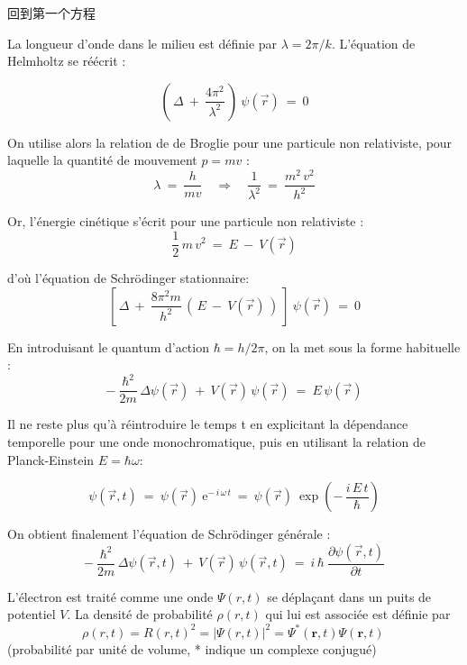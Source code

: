 \documentclass{article}
\begin{document}
回到第一个方程\par
La longueur d'onde dans le milieu est d\'efinie par $\lambda = 2 \pi/k$. L'\'equation de Helmholtz se r\'e\'ecrit :

$$
\left( \, \Delta \ + \ \frac{4\pi^2}{\lambda^2} \, \right) \ \psi(\vec{r}) \ = \ 0
$$

On utilise alors la relation de de Broglie pour une particule non relativiste, pour laquelle la quantit\'e de mouvement $p = m v$  :
$$
\lambda \ = \ \frac{h}{mv} \quad \Longrightarrow \quad \frac{1}{\lambda^2} \ = \ \frac{m^2 \, v^2}{h^2}
$$

Or, l'\'energie cin\'etique s'\'ecrit pour une particule non relativiste :
$$
\frac{1}{2} \, m \, v^2 \ = \ E \ - \ V(\vec{r})
$$

d'o\`u l'\'equation de Schr\"odinger stationnaire:
$$
\left[ \, \Delta \ + \ \frac{8\pi^2m}{h^2} \, \left( \, E \ - \ V(\vec{r}) \, \right) \ \right] \ \psi(\vec{r}) \ = \ 0
$$

En introduisant le quantum d'action $\hbar = h/2\pi$, on la met sous la forme habituelle :
$$
- \ \frac{\hbar^2}{2m} \, \Delta \psi(\vec{r}) \ + \ V(\vec{r}) \, \psi(\vec{r}) \ = \ E \, \psi(\vec{r})
$$

Il ne reste plus qu'\`a r\'eintroduire le temps t en explicitant la d\'ependance temporelle pour une onde monochromatique, puis en utilisant la relation de Planck-Einstein $E = \hbar \omega$:

$$
\psi(\vec{r},t) \ = \ \psi(\vec{r}) \ \mathrm{e}^{- \, i \, \omega \, t} \ = \ \psi(\vec{r}) \ \exp \left( - \, \frac{i \, E \, t}{\hbar} \right)
$$

On obtient finalement l'\'equation de Schr\"odinger g\'en\'erale :
$$
- \ \frac{\hbar^2}{2m} \, \Delta \psi(\vec{r},t) \ + \ V(\vec{r}) \, \psi(\vec{r},t) \ = \ i \, \hbar \ \frac{\partial \psi(\vec{r},t)}{\partial t}
$$


L'\'electron est trait\'e comme une onde $\Psi(r,t)$ se d\'epla\c cant dans un puits de potentiel $V$.
La densit\'e de probabilit\'e $\rho(r,t)$ qui lui est associ\'ee est d\'efinie par
$$
\rho(r,t)= R(r,t)^2 = |\Psi(r,t)|^2=\Psi^*(\mathbf{r},t)\Psi(\mathbf{r},t)\,\!
$$
(probabilit\'e par unit\'e de volume, * indique un complexe conjugu\'e)
\end{document}
